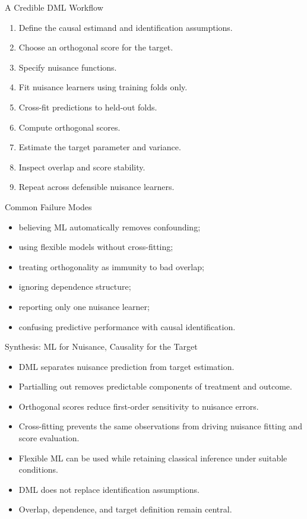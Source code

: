 \documentclass[aspectratio=169,11pt]{beamer}
\begin{document}
\begin{frame}{A Credible DML Workflow}
\begin{enumerate}
\item Define the causal estimand and identification assumptions.
\item Choose an orthogonal score for the target.
\item Specify nuisance functions.
\item Fit nuisance learners using training folds only.
\item Cross-fit predictions to held-out folds.
\item Compute orthogonal scores.
\item Estimate the target parameter and variance.
\item Inspect overlap and score stability.
\item Repeat across defensible nuisance learners.
\end{enumerate}
\end{frame}

\begin{frame}{Common Failure Modes}
\begin{itemize}
\item believing ML automatically removes confounding;
\item using flexible models without cross-fitting;
\item treating orthogonality as immunity to bad overlap;
\item ignoring dependence structure;
\item reporting only one nuisance learner;
\item confusing predictive performance with causal identification.
\end{itemize}
\end{frame}

\begin{frame}{Synthesis: ML for Nuisance, Causality for the Target}
\begin{itemize}
\item DML separates nuisance prediction from target estimation.
\item Partialling out removes predictable components of treatment and outcome.
\item Orthogonal scores reduce first-order sensitivity to nuisance errors.
\item Cross-fitting prevents the same observations from driving nuisance fitting and score evaluation.
\item Flexible ML can be used while retaining classical inference under suitable conditions.
\item DML does not replace identification assumptions.
\item Overlap, dependence, and target definition remain central.
\end{itemize}
\end{frame}
\end{document}
